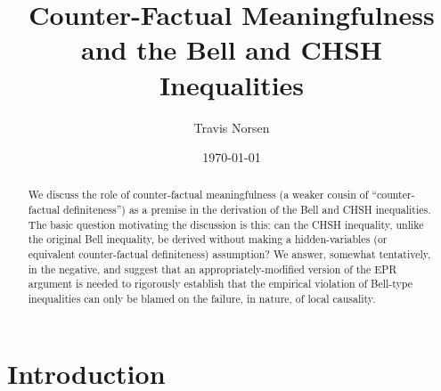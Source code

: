 \documentclass[aps,prc,onecolumn,12pt]{revtex4-2}
\begin{document}
\title{Counter-Factual Meaningfulness and the Bell and CHSH Inequalities}
\author{Travis Norsen}

\date{\today}

\begin{abstract}
We discuss the role of counter-factual meaningfulness (a weaker
cousin of ``counter-factual definiteness'') as a premise in
the derivation of the Bell and CHSH inequalities.  The basic question
motivating the discussion is this:  can the CHSH inequality, unlike
the original Bell inequality, be derived without making a
hidden-variables (or equivalent counter-factual definiteness)
assumption?  We answer, somewhat tentatively, in the negative, and
suggest that an appropriately-modified version of the EPR argument is
needed to rigorously establish that the empirical violation of
Bell-type inequalities can only be blamed on the failure, in nature,
of local causality.
\end{abstract}

\maketitle


\section{Introduction}
\label{intro}
\end{document}
